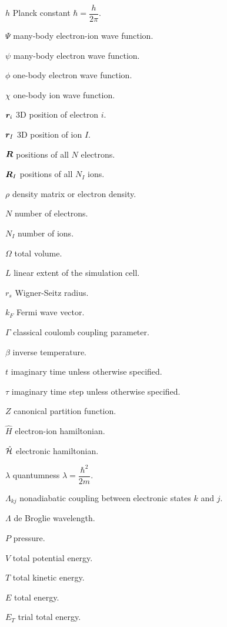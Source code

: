 \begin{symbollist}[0.7in]
\item[$h$] Planck constant $\hbar=\dfrac{h}{2\pi}$.
\item[$\Psi$] many-body electron-ion wave function.
\item[$\psi$] many-body electron wave function.
\item[$\phi$] one-body electron wave function.
\item[$\chi$] one-body ion wave function.
\item[$\boldsymbol{r}_i$] 3D position of electron $i$.
\item[$\boldsymbol{r}_I$] 3D position of ion $I$.
\item[$\boldsymbol{R}$] positions of all $N$ electrons.
\item[$\boldsymbol{R}_I$] positions of all $N_I$ ions.
\item[$\rho$] density matrix or electron density.
\item[$N$] number of electrons.
\item[$N_I$] number of ions.
\item[$\Omega$] total volume.
\item[$L$] linear extent of the simulation cell.
\item[$r_s$] Wigner-Seitz radius.
\item[$k_F$] Fermi wave vector.
\item[$\Gamma$] classical coulomb coupling parameter.
\item[$\beta$] inverse temperature.
\item[$t$] imaginary time unless otherwise specified.
\item[$\tau$] imaginary time step unless otherwise specified.
\item[$Z$] canonical partition function.
\item[$\hat{H}$] electron-ion hamiltonian.
\item[$\hat{\mathcal{H}}$] electronic hamiltonian.
\item[$\lambda$] quantumness $\lambda=\dfrac{\hbar^2}{2m}$.
\item[$\Lambda_{kj}$] nonadiabatic coupling between electronic states $k$ and $j$.
\item[$\Lambda$] de Broglie wavelength.
\item[$P$] pressure.
\item[$V$] total potential energy.
\item[$T$] total kinetic energy.
\item[$E$] total energy.
\item[$E_T$] trial total energy.

\end{symbollist}
